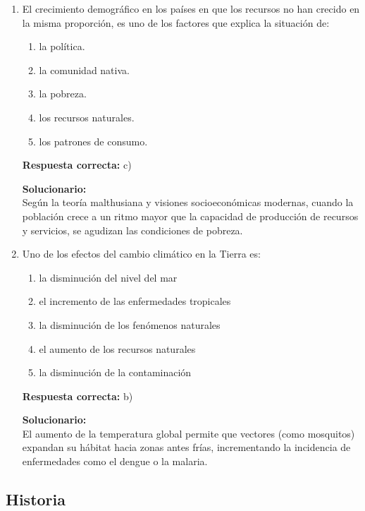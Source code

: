 \begin{enumerate}
	\item El crecimiento demográfico en los países en que los recursos no han crecido en la misma proporción, es uno de los factores que explica la situación de:
	\begin{enumerate}[label=\alph*)]
		\item la política.
		\item la comunidad nativa.
		\item la pobreza.
		\item los recursos naturales.
		\item los patrones de consumo.
	\end{enumerate}
	\textbf{Respuesta correcta:} c)
	
	\vspace{2mm}
	\textbf{Solucionario:}\\
	Según la teoría malthusiana y visiones socioeconómicas modernas, cuando la población crece a un ritmo mayor que la capacidad de producción de recursos y servicios, se agudizan las condiciones de pobreza.
	
	\vspace{6mm}
	
	\item Uno de los efectos del cambio climático en la Tierra es:
	\begin{enumerate}[label=\alph*)]
		\item la disminución del nivel del mar
		\item el incremento de las enfermedades tropicales
		\item la disminución de los fenómenos naturales
		\item el aumento de los recursos naturales
		\item la disminución de la contaminación
	\end{enumerate}
	\textbf{Respuesta correcta:} b)
	
	\vspace{2mm}
	\textbf{Solucionario:}\\
	El aumento de la temperatura global permite que vectores (como mosquitos) expandan su hábitat hacia zonas antes frías, incrementando la incidencia de enfermedades como el dengue o la malaria.
	
	\vspace{6mm}
\end{enumerate}

\subsection*{Historia}

